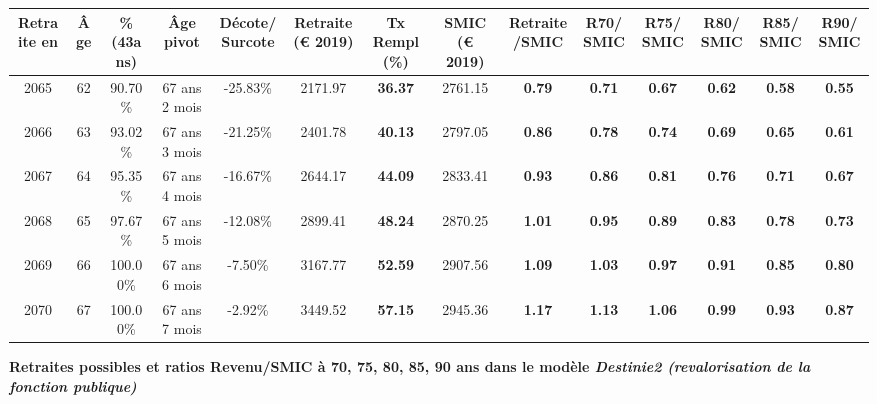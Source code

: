 \begin{adjustbox}{max width=\textwidth} 
\begin{tabular}[htb]{|c|c||c|c|c||c|c||c|c||c|c|c|c|c|} 
\hline 
 Retraite en &  Âge &  \%(43ans) &  Âge pivot &  Décote/Surcote &  Retraite (\euro{} 2019) &  Tx Rempl(\%) &  SMIC (\euro{} 2019) &  Retraite/SMIC &  R70/SMIC &  R75/SMIC &  R80/SMIC &  R85/SMIC &  R90/SMIC \\ 
\hline \hline 
 2065 &  62 &  90.70\% &  67 ans 2 mois &  -25.83\% &  2171.97 &  {\bf 36.37} &  2761.15 &  {\bf {\color{red} 0.79}} &  {\bf {\color{red} 0.71}} &  {\bf {\color{red} 0.67}} &  {\bf {\color{red} 0.62}} &  {\bf {\color{red} 0.58}} &  {\bf {\color{red} 0.55}} \\ 
\hline 
 2066 &  63 &  93.02\% &  67 ans 3 mois &  -21.25\% &  2401.78 &  {\bf 40.13} &  2797.05 &  {\bf {\color{red} 0.86}} &  {\bf {\color{red} 0.78}} &  {\bf {\color{red} 0.74}} &  {\bf {\color{red} 0.69}} &  {\bf {\color{red} 0.65}} &  {\bf {\color{red} 0.61}} \\ 
\hline 
 2067 &  64 &  95.35\% &  67 ans 4 mois &  -16.67\% &  2644.17 &  {\bf 44.09} &  2833.41 &  {\bf {\color{red} 0.93}} &  {\bf {\color{red} 0.86}} &  {\bf {\color{red} 0.81}} &  {\bf {\color{red} 0.76}} &  {\bf {\color{red} 0.71}} &  {\bf {\color{red} 0.67}} \\ 
\hline 
 2068 &  65 &  97.67\% &  67 ans 5 mois &  -12.08\% &  2899.41 &  {\bf 48.24} &  2870.25 &  {\bf 1.01} &  {\bf {\color{red} 0.95}} &  {\bf {\color{red} 0.89}} &  {\bf {\color{red} 0.83}} &  {\bf {\color{red} 0.78}} &  {\bf {\color{red} 0.73}} \\ 
\hline 
 2069 &  66 &  100.00\% &  67 ans 6 mois &  -7.50\% &  3167.77 &  {\bf 52.59} &  2907.56 &  {\bf 1.09} &  {\bf 1.03} &  {\bf {\color{red} 0.97}} &  {\bf {\color{red} 0.91}} &  {\bf {\color{red} 0.85}} &  {\bf {\color{red} 0.80}} \\ 
\hline 
 2070 &  67 &  100.00\% &  67 ans 7 mois &  -2.92\% &  3449.52 &  {\bf 57.15} &  2945.36 &  {\bf 1.17} &  {\bf 1.13} &  {\bf 1.06} &  {\bf {\color{red} 0.99}} &  {\bf {\color{red} 0.93}} &  {\bf {\color{red} 0.87}} \\ 
\hline 
\hline 
\end{tabular} 
\end{adjustbox} 
 
 \vspace{0.1cm} 
{\bf \noindent Retraites possibles et ratios Revenu/SMIC à 70, 75, 80, 85, 90 ans dans le modèle \emph{Destinie2 (revalorisation de la fonction publique)}}  
 
